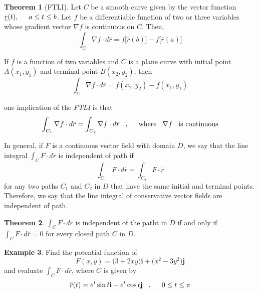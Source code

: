 \documentclass[11pt,a4paper]{article}
\theoremstyle{definition}
\newtheorem{thm}{Theorem}[subsection]
\newtheorem{exa}[thm]{Example}
\begin{document}
\begin{thm}[FTLI]


Let $C$ be a smooth curve given by the vector function $\underline{r}(t),\hspace{0.5cm} a\leq t \leq b$. Let $f$ be a differentiable function of two or three variables whose gradient vector $\nabla f$ is continuous on $C$. Then, $$\int_C \nabla f \cdot d\overline{r} = f\big[\overline{r}(b)\big] - f\big[\overline{r}(a)\big]$$


If $f$ is a function of two variables and $C$ is a plane curve with initial point $A(x_1,y_1)$ and terminal point $B(x_2,y_2)$, then $$\int_C \nabla f \cdot d\overline{r} = f(x_2,y_2) - f(x_1,y_1)$$

one implication of the \textit{FTLI} is that $$\int_{C_1}\nabla f \cdot d\overline{r} = \int_{C_2}\nabla f\cdot d \overline{r}\hspace{0.3cm},\hspace{0.5cm}\text{where}\hspace{0.3cm}\nabla f \hspace{0.3cm} \text{is continuous}$$

In general, if $F$ is a continuous vector field with domain $D$, we say that the line integral $\displaystyle{\int_C F\cdot d\overline{r}}$ is independent of path if $$\int_{C_1}F\cdot d\overline{r} = \int_{C_2}F\cdot \overline{r}$$ for any two paths $C_1$ and $C_2$ in $D$ that have the same initial and terminal points. Therefore, we say that the line integral of conservative vector fields are independent of path.
\end{thm}


\begin{thm}


$\displaystyle{\int_C F\cdot d\overline{r}}$ is independent of the patht in $D$ if and only if $\displaystyle{\int_C F\cdot d\overline{r} = 0}$ for every closed path $C$ in $D$.
\end{thm}


\begin{exa}


Find the potential function of $$F(x,y) = \big(3 + 2xy\big) \textbf{i} + \big(x^2 - 3y^2\big)\textbf{j}$$ and evaluate $\displaystyle{\int_C F\cdot d\overline{r}}$, where $C$ is given by $$\overline{r}(t) = e^t \sin t \textbf{i} + e^t \cos t \textbf{j}\hspace{0.3cm}, \hspace{0.5cm} 0 \leq t \leq \pi$$
\end{exa}
\end{document}
